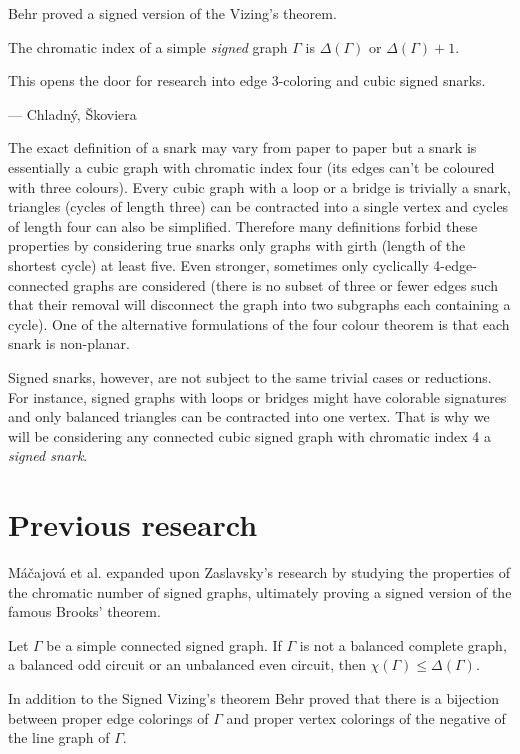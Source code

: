 Behr proved a signed version of the Vizing's theorem.

\begin{theorem}
    The chromatic index of a simple \textit{signed} graph $\Gamma$ is $\Delta(\Gamma)$ or $\Delta(\Gamma) + 1$.
\end{theorem}

This opens the door for research into edge 3-coloring and cubic signed snarks.

 --- Chladný, Škoviera \cite{skoviera-citat}

The exact definition of a snark may vary from paper to paper but a snark is essentially a cubic graph with chromatic index four (its edges can't be coloured with three colours). Every cubic graph with a loop or a bridge is trivially a snark, triangles (cycles of length three) can be contracted into a single vertex and cycles of length four can also be simplified. Therefore many definitions forbid these properties by considering true snarks only graphs with girth (length of the shortest cycle) at least five. Even stronger, sometimes only cyclically 4-edge-connected graphs are considered (there is no subset of three or fewer edges such that their removal will disconnect the graph into two subgraphs each containing a cycle). One of the alternative formulations of the four colour theorem is that each snark is non-planar.

Signed snarks, however, are not subject to the same trivial cases or reductions. For instance, signed graphs with loops or bridges might have colorable signatures and only balanced triangles can be contracted into one vertex. That is why we will be considering any connected cubic signed graph with chromatic index 4 a \textit{signed snark}.

\section{Previous research}

Máčajová et al. expanded upon Zaslavsky's research by studying the properties of the chromatic number of signed graphs, ultimately proving a signed version of the famous Brooks' \cite{brooks} theorem.

\begin{theorem}\label{th:brooks}
    Let $\Gamma$ be a simple connected signed graph. If $\Gamma$ is not a balanced complete graph, a balanced odd circuit or an unbalanced even circuit, then $\chi(\Gamma) \leq \Delta(\Gamma)$.
\end{theorem}

In addition to the Signed Vizing's theorem Behr \cite{behr-edge-colouring} proved that there is a bijection between proper edge colorings of $\Gamma$ and proper vertex colorings of the negative of the line graph of $\Gamma$.
